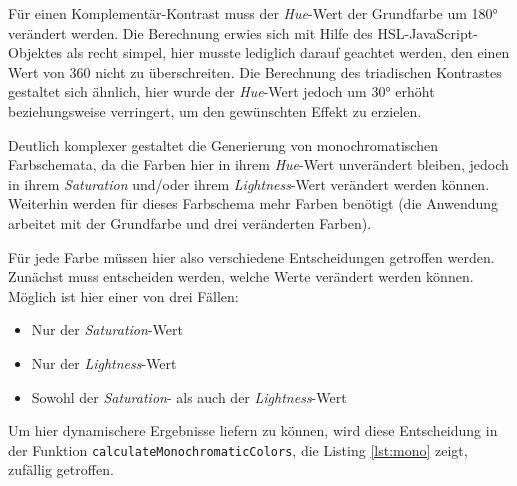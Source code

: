 
Für einen Komplementär-Kontrast muss der \textit{Hue}-Wert der Grundfarbe um 180° verändert werden. Die Berechnung erwies sich mit Hilfe des HSL-JavaScript-Objektes als recht simpel, hier musste lediglich darauf geachtet werden, den einen Wert von 360 nicht zu überschreiten.
Die Berechnung des triadischen Kontrastes gestaltet sich ähnlich, hier wurde der \textit{Hue}-Wert jedoch um 30° erhöht beziehungsweise verringert, um den gewünschten Effekt zu erzielen.

Deutlich komplexer gestaltet die Generierung von monochromatischen Farbschemata, da die Farben hier in ihrem \textit{Hue}-Wert unverändert bleiben, jedoch in ihrem \textit{Saturation} und/oder ihrem \textit{Lightness}-Wert verändert werden können. Weiterhin werden für dieses Farbschema mehr Farben benötigt (die Anwendung arbeitet mit der Grundfarbe und drei veränderten Farben).

Für jede Farbe müssen hier also verschiedene Entscheidungen getroffen werden. Zunächst muss entscheiden werden, welche Werte verändert werden können. Möglich ist hier einer von drei Fällen:

\begin{itemize}
  \item Nur der \textit{Saturation}-Wert
  \item Nur der \textit{Lightness}-Wert
  \item Sowohl der \textit{Saturation}- als auch der \textit{Lightness}-Wert
\end{itemize}

Um hier dynamischere Ergebnisse liefern zu können, wird diese Entscheidung in der Funktion \texttt{calculateMonochromaticColors}, die Listing \ref{lst:mono} zeigt, zufällig getroffen.

